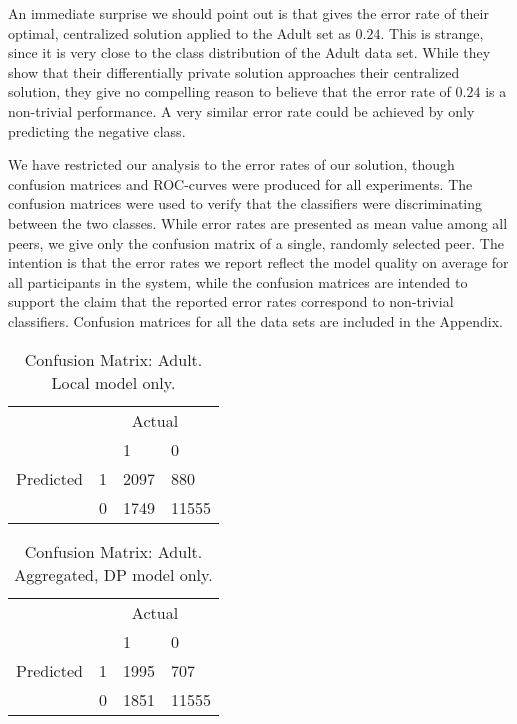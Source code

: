 An immediate surprise we should point out is that \cite{pathak2010diffprivhomo} gives the error rate of their optimal, centralized solution applied to the Adult set as $0.24$. This is strange, since it is very close to the class distribution of the Adult data set. While they show that their differentially private solution approaches their centralized solution, they give no compelling reason to believe that the error rate of $0.24$ is a non-trivial performance. A very similar error rate could be achieved by only predicting the negative class.

We have restricted our analysis to the error rates of our solution, though confusion matrices and ROC-curves were produced for all experiments. The confusion matrices were used to verify that the classifiers were discriminating between the two classes. While error rates are presented as mean value among all peers, we give only the confusion matrix of a single, randomly selected peer. The intention is that the error rates we report reflect the model quality on average for all participants in the system, while the confusion matrices are intended to support the claim that the reported error rates correspond to non-trivial classifiers. Confusion matrices for all the data sets are included in the Appendix.


\begin{table}[h]
	\centering
	\begin{tabular}{llll}
		& \multicolumn{3}{c}{Actual}                                                      \\
		\multicolumn{1}{c}{} &                        & 1                         & 0                          \\ \cline{3-4} 
		Predicted            & \multicolumn{1}{l|}{1} & \multicolumn{1}{l|}{2097} & \multicolumn{1}{l|}{880}   \\ \cline{3-4} 
		& \multicolumn{1}{l|}{0} & \multicolumn{1}{l|}{1749} & \multicolumn{1}{l|}{11555} \\ \cline{3-4} 
	\end{tabular}
	\caption{Confusion Matrix: Adult. Local model only.}
	\label{fig:confmat_adult_local}
\end{table}

\begin{table}[h]
	\centering
	\begin{tabular}{llll}
		& \multicolumn{3}{c}{Actual}                                                      \\
		\multicolumn{1}{c}{} &                        & 1                         & 0                          \\ \cline{3-4} 
		Predicted            & \multicolumn{1}{l|}{1} & \multicolumn{1}{l|}{1995} & \multicolumn{1}{l|}{707}   \\ \cline{3-4} 
		& \multicolumn{1}{l|}{0} & \multicolumn{1}{l|}{1851} & \multicolumn{1}{l|}{11555} \\ \cline{3-4} 
	\end{tabular}
		\caption{Confusion Matrix: Adult. Aggregated, DP model only.}
		\label{fig:confmat_adult_aggdp}
\end{table}

